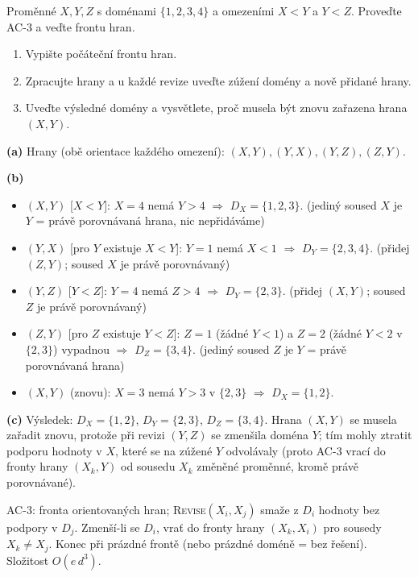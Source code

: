 \begin{zadani}
Proměnné $X,Y,Z$ s doménami $\{1,2,3,4\}$ a omezeními $X<Y$ a $Y<Z$. Proveďte AC-3 a veďte frontu hran.
\begin{enumerate}[label=(\alph*)]
  \item {} Vypište počáteční frontu hran.
  \item {} Zpracujte hrany a u každé revize uveďte zúžení domény a nově přidané hrany.
  \item {} Uveďte výsledné domény a vysvětlete, proč musela být znovu zařazena hrana $(X,Y)$.
\end{enumerate}
\end{zadani}

\begin{reseni}
\textbf{(a)} Hrany (obě orientace každého omezení): $(X,Y),(Y,X),(Y,Z),(Z,Y)$.

\textbf{(b)}
\begin{itemize}\setlength\itemsep{1pt}
  \item $(X,Y)$ [$X<Y$]: $X{=}4$ nemá $Y>4$ $\Rightarrow$ $D_X=\{1,2,3\}$. (jediný soused $X$ je $Y$ = právě porovnávaná hrana, nic nepřidáváme)
  \item $(Y,X)$ [pro $Y$ existuje $X<Y$]: $Y{=}1$ nemá $X<1$ $\Rightarrow$ $D_Y=\{2,3,4\}$. (přidej $(Z,Y)$; soused $X$ je právě porovnávaný)
  \item $(Y,Z)$ [$Y<Z$]: $Y{=}4$ nemá $Z>4$ $\Rightarrow$ $D_Y=\{2,3\}$. (přidej $(X,Y)$; soused $Z$ je právě porovnávaný)
  \item $(Z,Y)$ [pro $Z$ existuje $Y<Z$]: $Z{=}1$ (žádné $Y<1$) a $Z{=}2$ (žádné $Y<2$ v $\{2,3\}$) vypadnou $\Rightarrow$ $D_Z=\{3,4\}$. (jediný soused $Z$ je $Y$ = právě porovnávaná hrana)
  \item $(X,Y)$ (znovu): $X{=}3$ nemá $Y>3$ v $\{2,3\}$ $\Rightarrow$ $D_X=\{1,2\}$.
\end{itemize}

\textbf{(c)} Výsledek: $D_X=\{1,2\}$, $D_Y=\{2,3\}$, $D_Z=\{3,4\}$. Hrana $(X,Y)$ se musela zařadit znovu, protože při revizi $(Y,Z)$ se zmenšila doména $Y$; tím mohly ztratit podporu hodnoty v $X$, které se na zúžené $Y$ odvolávaly (proto AC-3 vrací do fronty hrany $(X_k,Y)$ od sousedu $X_k$ změněné proměnné, kromě právě porovnávané).
\end{reseni}

\begin{jadro}
AC-3: fronta orientovaných hran; \textsc{Revise}$(X_i,X_j)$ smaže z $D_i$ hodnoty bez podpory v $D_j$. Zmenší-li se $D_i$, vrať do fronty hrany $(X_k,X_i)$ pro sousedy $X_k\ne X_j$. Konec při prázdné frontě (nebo prázdné doméně = bez řešení). Složitost $O(e\,d^3)$.
\end{jadro}

